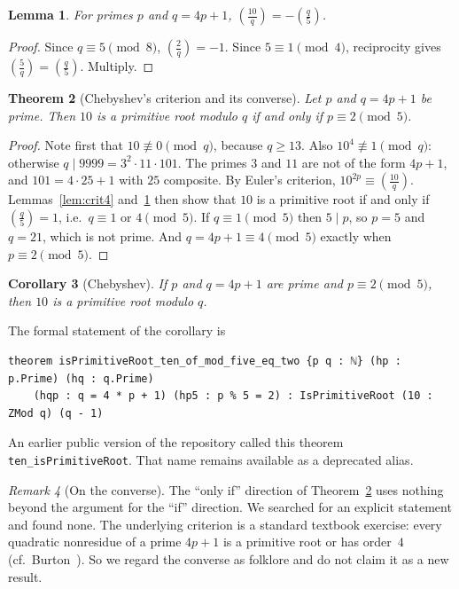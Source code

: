 \documentclass[11pt]{article}
\newtheorem{theorem}{Theorem}
\newtheorem{lemma}[theorem]{Lemma}
\newtheorem{corollary}[theorem]{Corollary}
\theoremstyle{remark}
\newtheorem{remark}[theorem]{Remark}
\newcommand{\leg}[2]{\left(\frac{#1}{#2}\right)}
\newcommand{\lean}[1]{\texttt{#1}}
\begin{document}
\begin{lemma}\label{lem:leg10}
For primes $p$ and $q=4p+1$, $\leg{10}{q}=-\leg{q}{5}$.
\end{lemma}
\begin{proof}
Since $q\equiv 5\pmod 8$, $\leg{2}{q}=-1$. Since $5\equiv 1\pmod 4$, reciprocity gives
$\leg{5}{q}=\leg{q}{5}$. Multiply.
\end{proof}

\begin{theorem}[Chebyshev's criterion and its converse]\label{thm:cheb-iff}
Let $p$ and $q=4p+1$ be prime. Then $10$ is a primitive root modulo $q$ if and only if
$p\equiv 2\pmod 5$.
\end{theorem}
\begin{proof}
Note first that $10\not\equiv 0\pmod q$, because $q\geq 13$. Also $10^4\not\equiv 1\pmod q$:
otherwise $q\mid 9999=3^2\cdot 11\cdot 101$. The primes $3$ and $11$ are not of the form $4p+1$,
and $101=4\cdot 25+1$ with $25$ composite. By Euler's criterion, $10^{2p}\equiv\leg{10}{q}$.
Lemmas~\ref{lem:crit4} and~\ref{lem:leg10} then show that $10$ is a primitive root if and only if
$\leg{q}{5}=1$, i.e.\ $q\equiv 1$ or $4\pmod 5$. If $q\equiv 1\pmod 5$ then $5\mid p$, so
$p=5$ and $q=21$, which is not prime. And $q=4p+1\equiv 4\pmod 5$ exactly when $p\equiv 2\pmod 5$.
\end{proof}

\begin{corollary}[Chebyshev]\label{cor:cheb}
If $p$ and $q=4p+1$ are prime and $p\equiv 2\pmod 5$, then $10$ is a primitive root modulo $q$.
\end{corollary}

The formal statement of the corollary is
\begin{lstlisting}
theorem isPrimitiveRoot_ten_of_mod_five_eq_two {p q : ℕ} (hp : p.Prime) (hq : q.Prime)
    (hqp : q = 4 * p + 1) (hp5 : p % 5 = 2) : IsPrimitiveRoot (10 : ZMod q) (q - 1)
\end{lstlisting}
An earlier public version of the repository called this theorem \lean{ten\_isPrimitiveRoot}.
That name remains available as a deprecated alias.

\begin{remark}[On the converse]
The ``only if'' direction of Theorem~\ref{thm:cheb-iff} uses nothing beyond the argument for the
``if'' direction. We searched for an explicit statement and found none. The underlying criterion
is a standard textbook exercise: every quadratic nonresidue of a prime $4p+1$ is a primitive
root or has order~$4$ (cf.\ Burton~\cite[\S9.2, Problem~11(a)]{Burton}). So we regard the converse as
folklore and do not claim it as a new result.
\end{remark}
\end{document}
